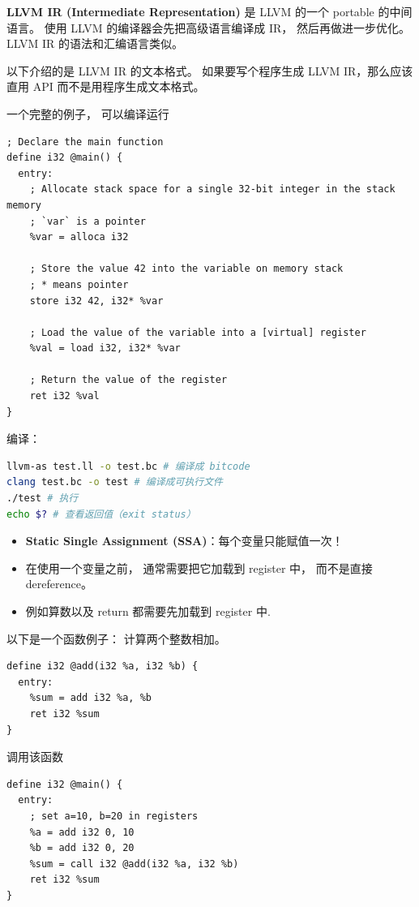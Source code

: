 

\textbf{LLVM IR (Intermediate Representation)} 是 LLVM 的一个 portable 的中间语言。 使用 LLVM 的编译器会先把高级语言编译成 IR， 然后再做进一步优化。 LLVM IR 的语法和汇编语言类似。

以下介绍的是 LLVM IR 的文本格式。 如果要写个程序生成 LLVM IR，那么应该直用 API 而不是用程序生成文本格式。

一个完整的例子， 可以编译运行
\begin{lstlisting}[language=none,caption=test.ll]
; Declare the main function
define i32 @main() {
  entry:
    ; Allocate stack space for a single 32-bit integer in the stack memory
    ; `var` is a pointer
    %var = alloca i32

    ; Store the value 42 into the variable on memory stack
    ; * means pointer
    store i32 42, i32* %var

    ; Load the value of the variable into a [virtual] register
    %val = load i32, i32* %var

    ; Return the value of the register
    ret i32 %val
}
\end{lstlisting}

编译：
\begin{lstlisting}[language=bash]
llvm-as test.ll -o test.bc # 编译成 bitcode
clang test.bc -o test # 编译成可执行文件
./test # 执行
echo $? # 查看返回值（exit status）
\end{lstlisting}

\begin{itemize}
\item \textbf{Static Single Assignment (SSA)}：每个变量只能赋值一次！
\item  在使用一个变量之前， 通常需要把它加载到 register 中， 而不是直接 dereference。
\item 例如算数以及 return 都需要先加载到 register 中.
\end{itemize}

以下是一个函数例子： 计算两个整数相加。
\begin{lstlisting}[language=none]
define i32 @add(i32 %a, i32 %b) {
  entry:
    %sum = add i32 %a, %b
    ret i32 %sum
}
\end{lstlisting}

调用该函数
\begin{lstlisting}[language=none]
define i32 @main() {
  entry:
    ; set a=10, b=20 in registers
    %a = add i32 0, 10
    %b = add i32 0, 20
    %sum = call i32 @add(i32 %a, i32 %b)
    ret i32 %sum
}
\end{lstlisting}

